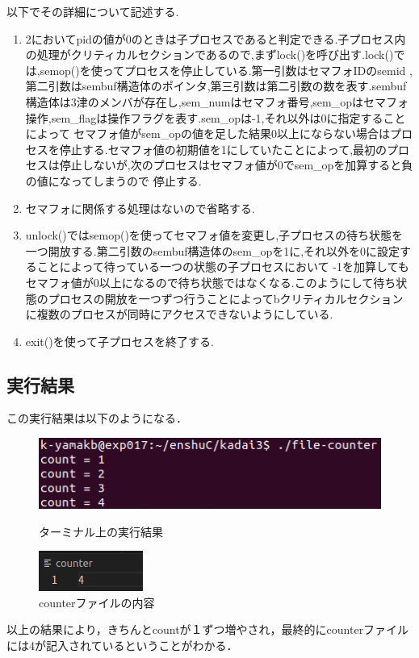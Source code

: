 \documentclass[dvipdfmx]{jarticle}
\begin{document}
以下でその詳細について記述する.
\begin{enumerate}
    \item 2においてpidの値が0のときは子プロセスであると判定できる.子プロセス内の処理がクリティカルセクションであるので,まずlock()を呼び出す.lock()では,semop()を使ってプロセスを停止している.第一引数はセマフォIDのsemid
    ,第二引数はsembuf構造体のポインタ,第三引数は第二引数の数を表す.sembuf構造体は3津のメンバが存在し,sem\_numはセマフォ番号,sem\_opはセマフォ操作,sem\_flagは操作フラグを表す.\cite{4}sem\_opは-1,それ以外は0に指定することによって
    セマフォ値がsem\_opの値を足した結果0以上にならない場合はプロセスを停止する.セマフォ値の初期値を1にしていたことによって,最初のプロセスは停止しないが,次のプロセスはセマフォ値が0でsem\_opを加算すると負の値になってしまうので
    停止する.
    \item セマフォに関係する処理はないので省略する.
    \item unlock()ではsemop()を使ってセマフォ値を変更し,子プロセスの待ち状態を一つ開放する.第二引数のsembuf構造体のsem\_opを1に,それ以外を0に設定することによって待っている一つの状態の子プロセスにおいて
    -1を加算してもセマフォ値が0以上になるので待ち状態ではなくなる.このようにして待ち状態のプロセスの開放を一つずつ行うことによってbクリティカルセクションに複数のプロセスが同時にアクセスできないようにしている.
    \item exit()を使って子プロセスを終了する.
\end{enumerate}
\subsection{実行結果}
この実行結果は以下のようになる．  \clearpage
\begin{figure}[htbp]
    \begin{minipage}[b]{0.45\linewidth}
      \centering
      \includegraphics[keepaspectratio, scale=0.7]{result3-1.png}
      \caption{ターミナル上の実行結果}
    \end{minipage}
    \begin{minipage}[b]{0.45\linewidth}
      \centering
      \includegraphics[keepaspectratio, scale=0.8]{result3-1-1.png}
      \caption{counterファイルの内容}
    \end{minipage}
  \end{figure}
  以上の結果により，きちんとcountが１ずつ増やされ，最終的にcounterファイルには4が記入されているということがわかる．
\end{document}
